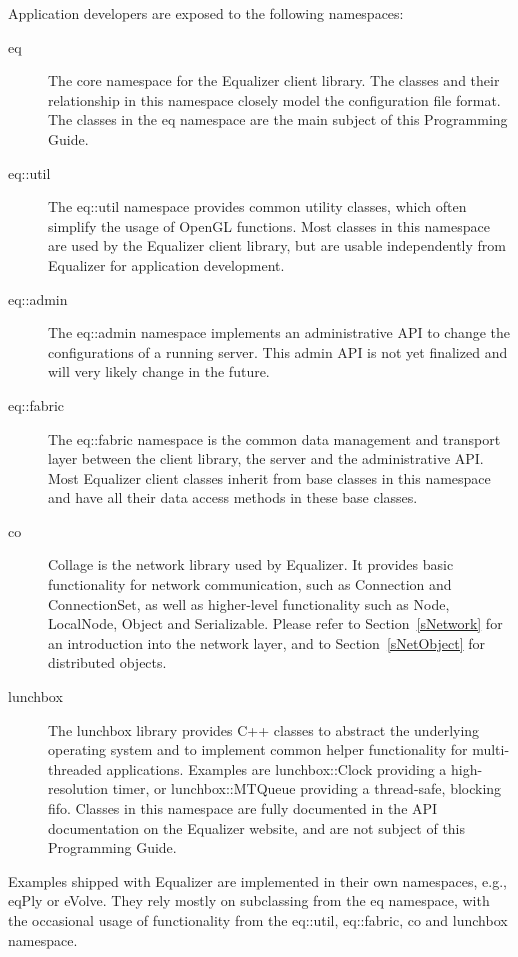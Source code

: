 \documentclass[10pt,a4]{scrartcl}
\newcommand{\sref}[1]{Section~\ref{#1}}
\begin{document}
Application developers are exposed to the following namespaces:

\begin{description}
\item[eq] The core namespace for the Equalizer client library. The
  classes and their relationship in this namespace closely model the
  configuration file format. The classes in the \textsf{eq} namespace
  are the main subject of this Programming Guide.
\item[eq::util] The eq::util namespace provides common utility classes, which
  often simplify the usage of OpenGL functions. Most classes in this namespace
  are used by the Equalizer client library, but are usable independently
  from Equalizer for application development.
\item[eq::admin] The eq::admin namespace implements an administrative API to
  change the configurations of a running server. This admin API is not yet
  finalized and will very likely change in the future.
\item[eq::fabric] The eq::fabric namespace is the common data management and
  transport layer between the client library, the server and the administrative
  API. Most Equalizer client classes inherit from base classes in this namespace
  and have all their data access methods in these base classes.
\item[co] Collage is the network library used by Equalizer. It provides basic
  functionality for network communication, such as \textsf{Connection} and
  \textsf{ConnectionSet}, as well as higher-level functionality such as
  \textsf{Node}, \textsf{LocalNode}, \textsf{Object} and
  \textsf{Serializable}. Please refer to \sref{sNetwork} for an introduction
  into the network layer, and to \sref{sNetObject} for distributed objects.
\item[lunchbox] The lunchbox library provides C++ classes to abstract the
  underlying operating system and to implement common helper functionality for
  multi-threaded applications. Examples are \textsf{lunchbox::Clock} providing a
  high-resolution timer, or \textsf{lunchbox::MTQueue} providing a thread-safe,
  blocking fifo. Classes in this namespace are fully documented in the API
  documentation on the Equalizer website, and are not subject of this
  Programming Guide.
\end{description}

Examples shipped with Equalizer are implemented in their own namespaces, e.g.,
\textsf{eqPly} or \textsf{eVolve}. They rely mostly on subclassing from the
\textsf{eq} namespace, with the occasional usage of functionality from the
\textsf{eq::util}, \textsf{eq::fabric}, \textsf{co} and \textsf{lunchbox}
namespace.
\end{document}
